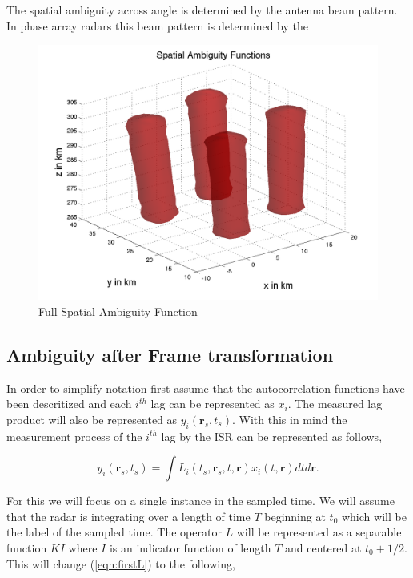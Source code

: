 \documentclass[10pt]{article}
\begin{document}
 The spatial ambiguity across angle is determined by the antenna beam pattern. In phase array radars this beam pattern is determined by the 
 
\begin{figure}[!t]
	\centering
	\includegraphics[width=5.5in]{spaceamb}
	\caption{Full Spatial Ambiguity Function}	
	\label{fig:chain}
\end{figure}

\subsection{Ambiguity after Frame transformation}
In order to simplify notation first assume that the autocorrelation functions have been descritized and each $i^{th}$ lag can be represented as $x_i$. The measured lag product will also be represented as $y_i(\mathbf{r}_s,t_s)$. With this in mind the measurement process of the $i^{th}$ lag by the ISR can be represented as follows,

\begin{equation}
\label{eqn:firstL}
y_i(\mathbf{r}_s,t_s) = \int L_i(t_s,\mathbf{r}_s,t,\mathbf{r})x_i(t,\mathbf{r})dtd\mathbf{r}.
\end{equation}

For this we will focus on a single instance in the sampled time. We will assume that the radar is integrating over a length of time $T$ beginning at $t_0$ which will be the label of the sampled time. The operator $L$ will be represented as a separable function $KI$ where $I$ is an indicator function of length $T$ and centered at $t_0+1/2$. This will change (\ref{eqn:firstL}) to the following,
\end{document}
